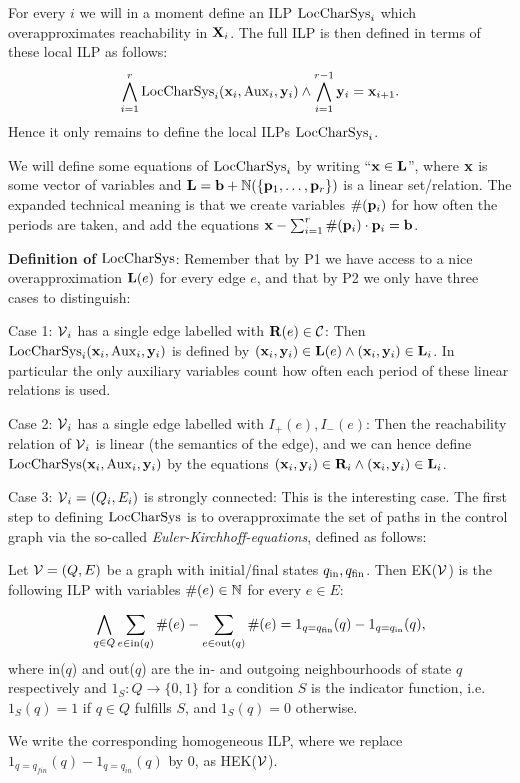 For every \(i\) we will in a moment define an ILP \(\operatorname{LocCharSys}_i\) which overapproximates reachability in \(\mathbf{X}_i\). The full ILP is then defined in terms of these local ILP as follows:
\[\bigwedge_{i=1}^r \operatorname{LocCharSys}_i(\mathbf{x}_i, \operatorname{Aux}_i, \mathbf{y}_i) \wedge \bigwedge_{i=1}^{r-1} \mathbf{y}_i=\mathbf{x}_{i+1}.\]
Hence it only remains to define the local ILPs \(\operatorname{LocCharSys}_i\).
\begin{remark}
We will define some equations of \(\operatorname{LocCharSys}_i\) by writing ``\(\mathbf{x} \in \mathbf{L}\)'', where \(\mathbf{x}\) is some vector of variables and \(\mathbf{L}=\mathbf{b}+\mathbb{N}(\{\mathbf{p}_1, \dots, \mathbf{p}_r\})\) is a linear set/relation. The expanded technical meaning is that we create variables \(\#(\mathbf{p}_i)\) for how often the periods are taken, and add the equations \(\mathbf{x}-\sum_{i=1}^r \#(\mathbf{p}_i) \cdot \mathbf{p}_i=\mathbf{b}\).
\end{remark}

\textbf{Definition of }\(\operatorname{LocCharSys}\): Remember that by P1 we have access to a nice overapproximation \(\mathbf{L}(e)\) for every edge \(e\), and that by P2 we only have three cases to distinguish:

Case 1: \(\operatorname{\mathcal{V}}_i\) has a single edge labelled with \(\mathbf{R}(e) \in \mathcal{C}\): Then \(\operatorname{LocCharSys}_i(\mathbf{x}_i, \operatorname{Aux}_i, \mathbf{y}_i)\) is defined by \((\mathbf{x}_i, \mathbf{y}_i) \in \mathbf{L}(e) \wedge (\mathbf{x}_i, \mathbf{y}_i) \in \mathbf{L}_i\). In particular the only auxiliary variables count how often each period of these linear relations is used.

Case 2: \(\operatorname{\mathcal{V}}_i\) has a single edge labelled with \(I_+(e), I_-(e)\): Then the reachability relation of \(\operatorname{\mathcal{V}}_i\) is linear (the semantics of the edge), and we can hence define \(\operatorname{LocCharSys}(\mathbf{x}_i, \operatorname{Aux}_i, \mathbf{y}_i)\) by the equations \((\mathbf{x}_i, \mathbf{y}_i) \in \mathbf{R}_i \wedge (\mathbf{x}_i, \mathbf{y}_i) \in \mathbf{L}_i\).

Case 3: \(\operatorname{\mathcal{V}}_i=(Q_i, E_i)\) is strongly connected: This is the interesting case. The first step to defining \(\operatorname{LocCharSys}\) is to overapproximate the set of paths in the control graph via the so-called \emph{Euler-Kirchhoff-equations}, defined as follows:

\begin{definition}
Let \(\operatorname{\mathcal{V}}=(Q,E)\) be a graph with initial/final states \(q_{\text{in}}, q_{\text{fin}}\). Then EK(\(\operatorname{\mathcal{V}}\)) is the following ILP with variables \(\#(e) \in \mathbb{N}\) for every \(e \in E\):

\[\bigwedge_{q \in Q}\sum_{e \in \text{in}(q)} \#(e)-\sum_{e \in \text{out}(q)} \#(e)=1_{q=q_{\text{fin}}}(q)-1_{q=q_{\text{in}}}(q),\] where in(\(q\)) and out(\(q\)) are the in- and outgoing neighbourhoods of state \(q\) respectively and \(1_S \colon Q \to \{0,1\}\) for a condition \(S\) is the indicator function, i.e.\ \(1_S(q)=1\) if \(q \in Q\) fulfills \(S\), and \(1_S(q)=0\) otherwise.

We write the corresponding homogeneous ILP, where we replace \(1_{q=q_{fin}}(q)-1_{q=q_{in}}(q)\) by \(0\), as HEK(\(\operatorname{\mathcal{V}}\)).
\end{definition}

